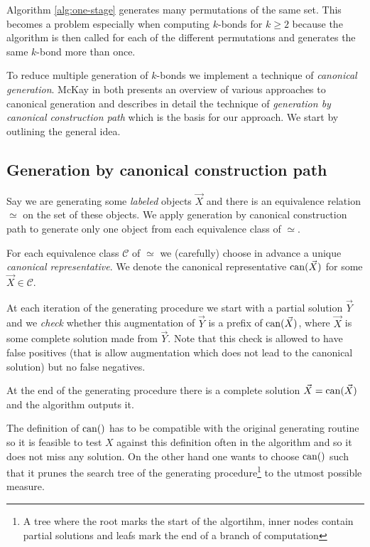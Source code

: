Algorithm \ref{alg:one-stage} generates many permutations of the same set. This becomes a problem especially when computing $k$-bonds for $k \geq 2$ because the algorithm is then called for each of the different permutations and generates the same $k$-bond more than once.

To reduce multiple generation of $k$-bonds we implement a technique of \textit{canonical generation}. McKay in \cite{mckay_isom} both presents an overview of various approaches to canonical generation and describes in detail the technique of \textit{generation by canonical construction path} which is the basis for our approach. We start by outlining the general idea.

\subsection*{Generation by canonical construction path}

Say we are generating some \textit{labeled} objects $\vec X$ and there is an equivalence relation $\simeq$ on the set of these objects. We apply generation by canonical construction path to generate only one object from each equivalence class of $\simeq$.

For each equivalence class $\mathcal{C}$ of $\simeq$ we (carefully) choose in advance a unique \textit{canonical representative}. We denote the canonical representative $\operatorname{can}(\vec X)$ for some $\vec X \in \mathcal{C}$.

At each iteration of the generating procedure we start with a partial solution $\vec Y$ and we \textit{check} whether this augmentation of $\vec Y$ is a prefix of $\operatorname{can}(\vec X)$, where $\vec X$ is some complete solution made from $\vec Y$. Note that this check is allowed to have false positives (that is allow augmentation which does not lead to the canonical solution) but no false negatives.

At the end of the generating procedure there is a complete solution \linebreak ${\vec X = \operatorname{can}(\vec{X}) }$ and the algorithm outputs it.

\sectionline

The definition of $\operatorname{can}()$ has to be compatible with the original generating routine so it is feasible to test $X$ against this definition often in the algorithm and so it does not miss any solution. On the other hand one wants to choose $\operatorname{can}()$ such that it prunes the search tree of the generating procedure\footnote{A tree where the root marks the start of the algortihm, inner nodes contain partial solutions and leafs mark the end of a branch of computation} to the utmost possible measure.

